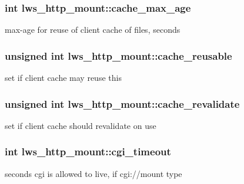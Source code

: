 \subsubsection[{\texorpdfstring{cache\+\_\+max\+\_\+age}{cache\_max\_age}}]{\setlength{\rightskip}{0pt plus 5cm}int lws\+\_\+http\+\_\+mount\+::cache\+\_\+max\+\_\+age}\hypertarget{structlws__http__mount_a4283e30ea89d27ae7d061ad760d1d146}{}\label{structlws__http__mount_a4283e30ea89d27ae7d061ad760d1d146}
max-\/age for reuse of client cache of files, seconds 
\subsubsection[{\texorpdfstring{cache\+\_\+reusable}{cache\_reusable}}]{\setlength{\rightskip}{0pt plus 5cm}unsigned int lws\+\_\+http\+\_\+mount\+::cache\+\_\+reusable}\hypertarget{structlws__http__mount_a8316dd183ffbef50419a5a4968d35d84}{}\label{structlws__http__mount_a8316dd183ffbef50419a5a4968d35d84}
set if client cache may reuse this 
\subsubsection[{\texorpdfstring{cache\+\_\+revalidate}{cache\_revalidate}}]{\setlength{\rightskip}{0pt plus 5cm}unsigned int lws\+\_\+http\+\_\+mount\+::cache\+\_\+revalidate}\hypertarget{structlws__http__mount_ae137203040c6153694bd88a708da5395}{}\label{structlws__http__mount_ae137203040c6153694bd88a708da5395}
set if client cache should revalidate on use 
\subsubsection[{\texorpdfstring{cgi\+\_\+timeout}{cgi\_timeout}}]{\setlength{\rightskip}{0pt plus 5cm}int lws\+\_\+http\+\_\+mount\+::cgi\+\_\+timeout}\hypertarget{structlws__http__mount_a4a7239d6d4c03986e6e1a72abb6c83aa}{}\label{structlws__http__mount_a4a7239d6d4c03986e6e1a72abb6c83aa}
seconds cgi is allowed to live, if cgi\+://mount type 
